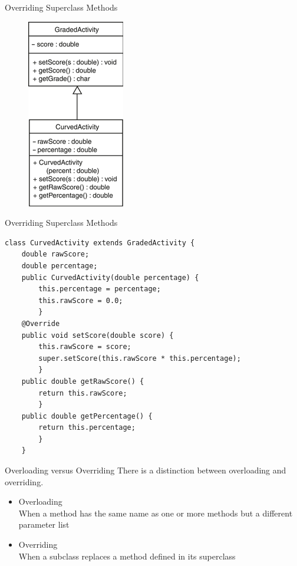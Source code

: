 \documentclass[11pt]{beamer}
\begin{document}
\begin{frame}{Overriding Superclass Methods}
    \noindent 
    \begin{figure}[H]
    \centering
    \includegraphics[scale=0.9]{Images/chapter10_section03_curvedActivity.png}
    \end{figure}
\end{frame}

\begin{frame}[fragile]{Overriding Superclass Methods}
\begin{lstlisting}[basicstyle=\ttfamily\footnotesize]
class CurvedActivity extends GradedActivity {
    double rawScore;
    double percentage;
    public CurvedActivity(double percentage) {
        this.percentage = percentage;
        this.rawScore = 0.0;
        }
    @Override
    public void setScore(double score) {
        this.rawScore = score;
        super.setScore(this.rawScore * this.percentage);
        }
    public double getRawScore() {
        return this.rawScore;
        }
    public double getPercentage() {
        return this.percentage;
        }
    }
\end{lstlisting}
\end{frame}

\begin{frame}{Overloading versus Overriding}
    There is a distinction between overloading and overriding.
    \begin{itemize}
        \item Overloading \\
        When a method has the same name as one or more methods but a different parameter list
        \item Overriding \\ 
        When a subclass replaces a method defined in its superclass
    \end{itemize}
\end{frame}
\end{document}
